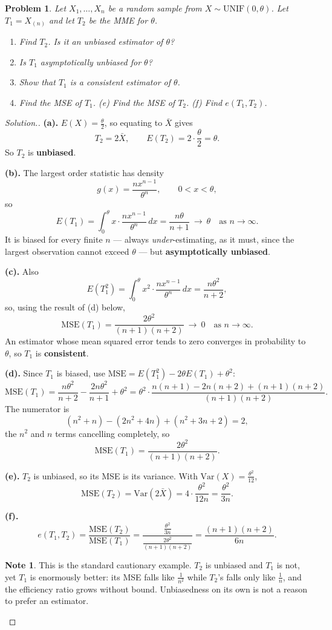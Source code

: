 \documentclass[12pt,a4paper]{report}
\theoremstyle{definition}
\newtheorem{note}[thm]{Note}
\theoremstyle{plain}
\newtheorem{problemx}{Problem}[section]
\newenvironment{problem}{\begin{problemx}}{\end{problemx}}
\newenvironment{solution}
  {\renewcommand{\qedsymbol}{}\begin{proof}[\textit{Solution}.]}
  {\end{proof}}
\begin{document}
\begin{problem}
Let $X_1,\ldots,X_n$ be a random sample from $X\sim\text{UNIF}(0,\theta)$. Let
$T_1=X_{(n)}$ and let $T_2$ be the MME for $\theta$.
\begin{enumerate}
\item[(a).] Find $T_2$. Is it an unbiased estimator of $\theta$?
\item[(b).] Is $T_1$ asymptotically unbiased for $\theta$?
\item[(c).] Show that $T_1$ is a consistent estimator of $\theta$.
\item[(d).] Find the MSE of $T_1$. \quad (e) Find the MSE of $T_2$.
\quad (f) Find $e(T_1,T_2)$.
\end{enumerate}
\end{problem}

\begin{solution}
\textbf{(a).} $E(X)=\frac{\theta}{2}$, so equating to $\bar X$ gives
\[T_2=2\bar X,\qquad E(T_2)=2\cdot\frac{\theta}{2}=\theta.\]
So $T_2$ is \textbf{unbiased}.

\textbf{(b).} The largest order statistic has density
\[g(x)=\frac{nx^{n-1}}{\theta^n},\qquad 0<x<\theta,\]
so
\[E(T_1)=\int_0^\theta x\cdot\frac{nx^{n-1}}{\theta^n}\,dx=\frac{n\theta}{n+1}
\ \longrightarrow\ \theta\quad\text{as }n\to\infty.\]
It is biased for every finite $n$ --- always \emph{under}-estimating, as it must,
since the largest observation cannot exceed $\theta$ --- but
\textbf{asymptotically unbiased}.

\textbf{(c).} Also
\[E\left(T_1^2\right)=\int_0^\theta x^2\cdot\frac{nx^{n-1}}{\theta^n}\,dx
=\frac{n\theta^2}{n+2},\]
so, using the result of (d) below,
\[\text{MSE}(T_1)=\frac{2\theta^2}{(n+1)(n+2)}\ \longrightarrow\ 0
\quad\text{as }n\to\infty.\]
An estimator whose mean squared error tends to zero converges in probability to
$\theta$, so $T_1$ is \textbf{consistent}.

\textbf{(d).} Since $T_1$ is biased, use $\text{MSE}=E\left(T_1^2\right)-2\theta
E(T_1)+\theta^2$:
\[\text{MSE}(T_1)=\frac{n\theta^2}{n+2}-\frac{2n\theta^2}{n+1}+\theta^2
=\theta^2\cdot\frac{n(n+1)-2n(n+2)+(n+1)(n+2)}{(n+1)(n+2)}.\]
The numerator is
\[\left(n^2+n\right)-\left(2n^2+4n\right)+\left(n^2+3n+2\right)=2,\]
the $n^2$ and $n$ terms cancelling completely, so
\[\text{MSE}(T_1)=\frac{2\theta^2}{(n+1)(n+2)}.\]

\textbf{(e).} $T_2$ is unbiased, so its MSE is its variance. With
$\text{Var}(X)=\frac{\theta^2}{12}$,
\[\text{MSE}(T_2)=\text{Var}\left(2\bar X\right)=4\cdot\frac{\theta^2}{12n}
=\frac{\theta^2}{3n}.\]

\textbf{(f).}
\[e(T_1,T_2)=\frac{\text{MSE}(T_2)}{\text{MSE}(T_1)}
=\frac{\frac{\theta^2}{3n}}{\frac{2\theta^2}{(n+1)(n+2)}}
=\frac{(n+1)(n+2)}{6n}.\]

\begin{note}
This is the standard cautionary example. $T_2$ is unbiased and $T_1$ is not, yet
$T_1$ is enormously better: its MSE falls like $\frac{1}{n^2}$ while $T_2$'s falls
only like $\frac{1}{n}$, and the efficiency ratio grows without bound. Unbiasedness
on its own is not a reason to prefer an estimator.
\end{note}
\end{solution}
\end{document}
